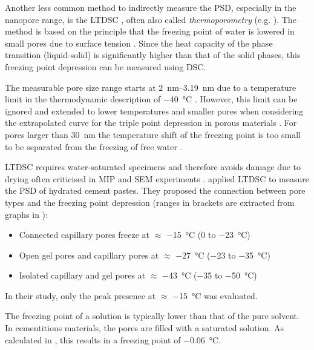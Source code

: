 Another less common method to indirectly measure the \ac{PSD}, especially in the nanopore range, is the \ac{LTDSC} \cite{brun.1973,brun.1977}, often also called \textit{thermoporometry} (e.g. \cite{joseph.2024}).
The method is based on the principle that the freezing point of water is lowered in small pores due to surface tension \cite{brun.1973,brun.1977}.
Since the heat capacity of the phase transition (liquid-solid) is significantly higher than that of the solid phases, this freezing point depression can be measured using \ac{DSC}.

The measurable pore size range starts at \qtyrange{2}{3.19}{\nano\meter} \cite{cuperus.1992} due to a temperature limit in the thermodynamic description of \qty{-40}{\celsius} \cite{brun.1977}.
However, this limit can be ignored and extended to lower temperatures and smaller pores when considering the extrapolated curve for the triple point depression in porous materials \cite{kloetstra.1995}.
For pores larger than \qty{30}{\nano\meter} the temperature shift of the freezing point is too small to be separated from the freezing of free water \cite{cuperus.1992,stocker.2002}.

\ac{LTDSC} requires water-saturated specimens and therefore avoids damage due to drying \cite{gran.1997,galle.2001} often criticised in \ac{MIP} and \ac{SEM} experiments \cite{chatterji.2001,georget.2024}.
\textcite{sant.2011} applied \ac{LTDSC} to measure the \ac{PSD} of hydrated cement pastes.
They proposed the connection between pore types and the freezing point depression (ranges in brackets are extracted from graphs in \cite{sant.2011}):
\begin{itemize}
	\item Connected capillary pores freeze at $\approx$ \qty{-15}{\celsius} (\num{0} to \qty{-23}{\celsius})
	\item Open gel pores and capillary pores at $\approx$ \qty{-27}{\celsius} (\num{-23} to \qty{-35}{\celsius})
	\item Isolated capillary and gel pores at $\approx$ \qty{-43}{\celsius} (\num{-35} to \qty{-50}{\celsius})
\end{itemize}
In their study, only the peak presence at $\approx$ \qty{-15}{\celsius} was evaluated.

The freezing point of a solution is typically lower than that of the pure solvent.
In cementitious materials, the pores are filled with a saturated  solution.
As calculated in , this results in a freezing point of \qty{-0.06}{\celsius}.

